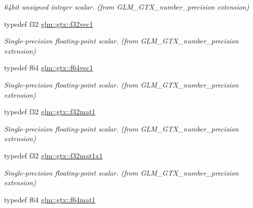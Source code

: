\begin{DoxyCompactItemize}
\begin{DoxyCompactList}\small\item\em 64bit unsigned integer scalar. (from G\+L\+M\+\_\+\+G\+T\+X\+\_\+number\+\_\+precision extension) \end{DoxyCompactList}\item 
typedef f32 \hyperlink{group__gtx__number__precision_gadab8e598b0b4697629482682bdb7f223}{glm\+::gtx\+::f32vec1}\hypertarget{group__gtx__number__precision_gadab8e598b0b4697629482682bdb7f223}{}\label{group__gtx__number__precision_gadab8e598b0b4697629482682bdb7f223}

\begin{DoxyCompactList}\small\item\em Single-\/precision floating-\/point scalar. (from G\+L\+M\+\_\+\+G\+T\+X\+\_\+number\+\_\+precision extension) \end{DoxyCompactList}\item 
typedef f64 \hyperlink{group__gtx__number__precision_ga44336a26c958d66efdfb5a6c114c538e}{glm\+::gtx\+::f64vec1}\hypertarget{group__gtx__number__precision_ga44336a26c958d66efdfb5a6c114c538e}{}\label{group__gtx__number__precision_ga44336a26c958d66efdfb5a6c114c538e}

\begin{DoxyCompactList}\small\item\em Single-\/precision floating-\/point scalar. (from G\+L\+M\+\_\+\+G\+T\+X\+\_\+number\+\_\+precision extension) \end{DoxyCompactList}\item 
typedef f32 \hyperlink{group__gtx__number__precision_gae5ff376ec910c360f06acc0c2b99260c}{glm\+::gtx\+::f32mat1}\hypertarget{group__gtx__number__precision_gae5ff376ec910c360f06acc0c2b99260c}{}\label{group__gtx__number__precision_gae5ff376ec910c360f06acc0c2b99260c}

\begin{DoxyCompactList}\small\item\em Single-\/precision floating-\/point scalar. (from G\+L\+M\+\_\+\+G\+T\+X\+\_\+number\+\_\+precision extension) \end{DoxyCompactList}\item 
typedef f32 \hyperlink{group__gtx__number__precision_ga01caec78388a82a9a22bd45e5751a38a}{glm\+::gtx\+::f32mat1x1}\hypertarget{group__gtx__number__precision_ga01caec78388a82a9a22bd45e5751a38a}{}\label{group__gtx__number__precision_ga01caec78388a82a9a22bd45e5751a38a}

\begin{DoxyCompactList}\small\item\em Single-\/precision floating-\/point scalar. (from G\+L\+M\+\_\+\+G\+T\+X\+\_\+number\+\_\+precision extension) \end{DoxyCompactList}\item 
typedef f64 \hyperlink{group__gtx__number__precision_ga23f8f53c78b50aa07a113c3d07d01bc9}{glm\+::gtx\+::f64mat1}\hypertarget{group__gtx__number__precision_ga23f8f53c78b50aa07a113c3d07d01bc9}{}\label{group__gtx__number__precision_ga23f8f53c78b50aa07a113c3d07d01bc9}


\end{DoxyCompactItemize}
